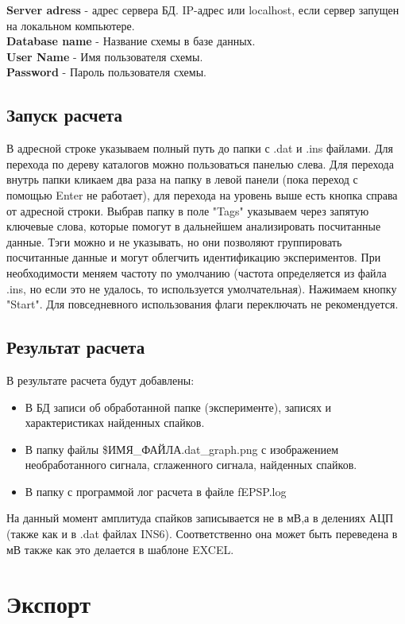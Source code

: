 \documentclass[12pt,a4paper]{report}
\begin{document}
\textbf{Server adress} - адрес сервера БД. IP-адрес или localhost, если сервер запущен на локальном компьютере.\\
\textbf{Database name} - Название схемы в базе данных.\\
\textbf{User Name} - Имя пользователя схемы.\\
\textbf{Password} - Пароль пользователя схемы.\\   
\newpage
\section{Запуск расчета}
В адресной строке указываем полный путь до папки с .dat и .ins файлами. Для перехода по дереву каталогов можно пользоваться панелью слева. Для перехода внутрь папки кликаем два раза на папку в левой панели (пока переход с помощью Enter не работает), для перехода на уровень выше есть кнопка справа от адресной строки. Выбрав папку в поле "Tags" указываем через запятую ключевые слова, которые помогут в дальнейшем анализировать посчитанные данные. Тэги можно и не указывать, но они позволяют группировать посчитанные данные и могут облегчить идентификацию экспериментов. При необходимости меняем частоту по умолчанию (частота определяется из файла .ins, но если это не удалось, то используется умолчательная). Нажимаем кнопку "Start". Для повседневного использования флаги переключать не рекомендуется.

\section{Результат расчета}
В результате расчета будут добавлены:
\begin{itemize}
\item В БД записи об обработанной папке (эксперименте), записях и характеристиках найденных спайков.
\item В папку файлы \$ИМЯ\_ФАЙЛА.dat\_graph.png с изображением необработанного сигнала, сглаженного сигнала, найденных спайков. 
\item В папку с программой лог расчета в файле fEPSP.log
\end{itemize}

На данный момент амплитуда спайков записывается не в мВ,а в делениях АЦП (также как и в .dat файлах INS6). Соответственно она может быть переведена в мВ также как это делается в шаблоне EXCEL. 

\chapter{Экспорт}
\end{document}
